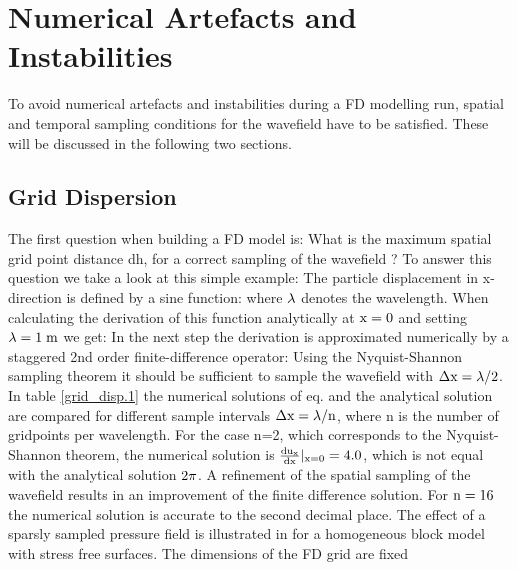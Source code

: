 \section{Numerical Artefacts and Instabilities}\label{num_instab}
To avoid numerical artefacts and instabilities during a FD modelling run, spatial and temporal sampling conditions for the wavefield 
have to be satisfied. These will be discussed in the following two sections. 
\subsection{Grid Dispersion}\label{grid-dispersion}
The first question when building a FD model is: What is the maximum spatial grid point distance dh, for a correct sampling of the wavefield ? To answer this question we take a look at this simple example: The particle displacement in x-direction is defined by a sine function:
where $\rm{\lambda}$ denotes the wavelength. When calculating the derivation of this function analytically at $\rm{x=0}$ and setting $\rm{\lambda=1\;m}$ we get:
In the next step the derivation is approximated numerically by a staggered 2nd order finite-difference operator:
Using the Nyquist-Shannon sampling theorem it should be sufficient to sample the wavefield with $\rm{\Delta x = \lambda/2}$. In table \ref{grid_disp.1} the
numerical solutions of eq.  and the analytical solution  are compared for different sample intervals 
$\rm{\Delta x = \lambda /n}$, where n is the number of gridpoints per wavelength. For the case n=2, which corresponds to the Nyquist-Shannon theorem, the
numerical solution is $\rm{\frac{d u_x}{d x}|_{x=0}=4.0}$, which is not equal with the analytical solution $\rm{2 \pi}$. A refinement of the spatial
sampling of the wavefield results in an improvement of the finite difference solution. For $\rm{n=16}$ the numerical solution is accurate to the second
decimal place. The effect of a sparsly sampled pressure field is illustrated in  for a homogeneous block model with stress free surfaces. The dimensions of the FD grid are fixed
